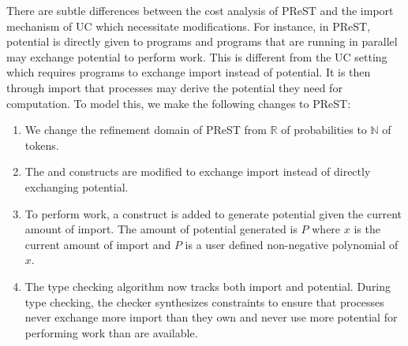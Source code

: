 There are subtle differences between the cost analysis of PReST and the import
mechanism of UC which necessitate modifications. For instance, in PReST, potential is
directly given to programs and programs that are running in parallel may
exchange potential to perform work. This is different from the UC setting which
requires programs to exchange import instead of potential. It is then through
import that processes may derive the potential they need for computation. 
To model this, we make the following changes to PReST:
\begin{enumerate}
\item We change the refinement domain of PReST from $\mathbb{R}$ of probabilities to $\mathbb{N}$ of tokens.
\item The  and  constructs are modified to exchange import instead of directly exchanging potential.
\item To perform work, a  construct is added to generate potential given the current amount 
of import. The amount of potential generated is $P$ where $x$ is the current amount of import and $P$ is a user 
defined non-negative polynomial of $x$.
\item The type checking algorithm now tracks both import and potential. During type checking, the checker synthesizes constraints to ensure that processes never exchange more import than they own and never use more potential
for performing work than are available.
\end{enumerate}

